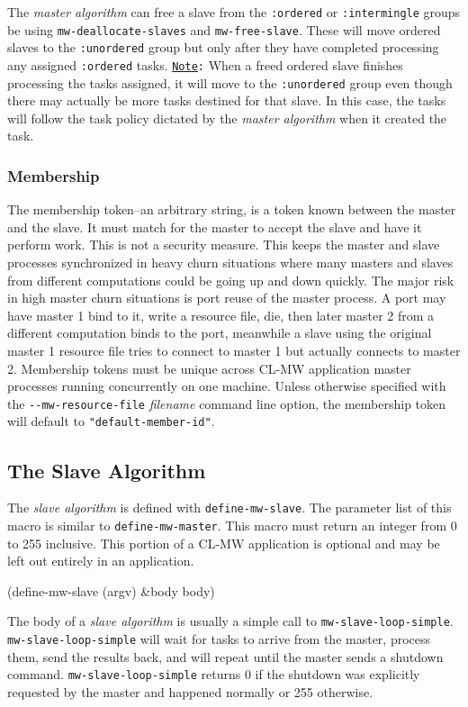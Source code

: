 \documentclass[titlepage,12pt]{book}
\newcommand{\xsmall}{\latexhtml{\small}{}}
\newcommand{\xnormalsize}{\latexhtml{\normalsize}{}}
\newcommand{\clmw}{\xsmall\textsc{CL-MW}\xnormalsize\xspace}
\newcommand{\sa}{\textit{slave algorithm}\xspace}
\newcommand{\ma}{\textit{master algorithm}\xspace}
\newcommand{\un}{\texttt{:unordered}\xspace}
\newcommand{\inter}{\texttt{:intermingle}\xspace}
\newcommand{\ord}{\texttt{:ordered}\xspace}
\newcommand{\dash}{\texttt{-}}
\newcommand{\func}[1]{\mbox{\texttt{#1}}\xspace}
\newcommand{\macro}[1]{\mbox{\texttt{#1}}\xspace}
\newcommand{\OptionV}[2]{\dash\dash\texttt{#1} \textit{#2}}
\newcommand{\Note}{\texttt{\underline{Note}:}\xspace}
\begin{document}
The \ma can free a slave from the \ord or \inter groups be using
\func{mw-deallocate-slaves} and \func{mw-free-slave}. These will move
ordered slaves to the \un group but only after they have completed
processing any assigned \ord tasks. \Note When a freed ordered slave
finishes processing the tasks assigned, it will move to the \un group
even though there may actually be more tasks destined for that slave.
In this case, the tasks will follow the task policy dictated by the
\ma when it created the task.

\subsubsection{Membership}

The membership token--an arbitrary string, is a token known between
the master and the slave. It must match for the master to accept the
slave and have it perform work. This is not a security measure. This
keeps the master and slave processes synchronized in heavy churn
situations where many masters and slaves from different computations
could be going up and down quickly. The major risk in high master
churn situations is port reuse of the master process. A port may
have master 1 bind to it, write a resource file, die, then later
master 2 from a different computation binds to the port, meanwhile
a slave using the original master 1 resource file tries to connect
to master 1 but actually connects to master 2.  Membership tokens
must be unique across \clmw application master processes running
concurrently on one machine. Unless otherwise specified with the
\OptionV{mw-resource-file}{filename} command line option, the membership
token will default to \texttt{"default-member-id"}.

\subsection{The Slave Algorithm}

The \sa is defined with \macro{define-mw-slave}.  The parameter list
of this macro is similar to \macro{define-mw-master}. This macro must
return an integer from 0 to 255 inclusive.  This portion of a \clmw
application is optional and may be left out entirely in an application.

\begin{barelisp}
(define-mw-slave (argv) &body body)
\end{barelisp}

The body of a \sa is usually a simple call to
\func{mw-slave-loop-simple}.  \func{mw-slave-loop-simple} will
wait for tasks to arrive from the master, process them, send the
results back, and will repeat until the master sends a shutdown
command. \func{mw-slave-loop-simple} returns 0 if the shutdown was
explicitly requested by the master and happened normally or 255
otherwise.
\end{document}
